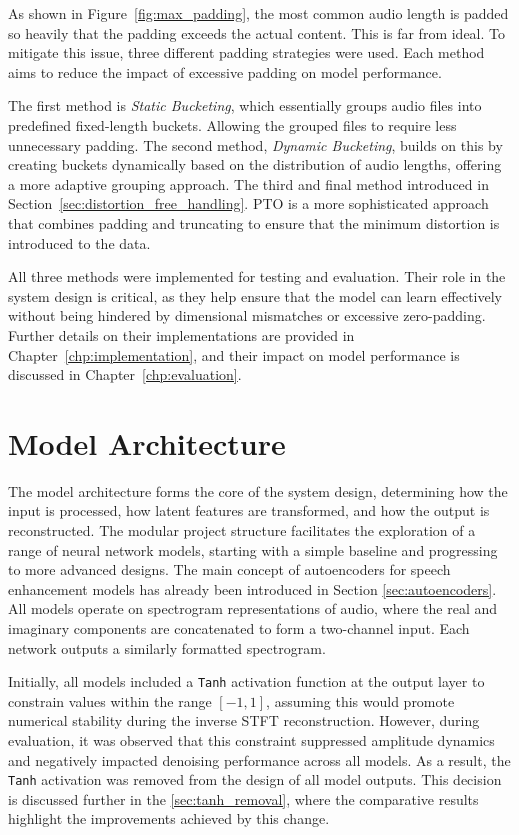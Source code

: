 As shown in Figure~\ref{fig:max_padding}, the most common audio length is padded so heavily that the padding exceeds the actual content. This is far from ideal. To mitigate this issue, three different padding strategies were used. Each method aims to reduce the impact of excessive padding on model performance.

The first method is \textit{Static Bucketing}, which essentially groups audio files into predefined fixed-length buckets. Allowing the grouped files to require less unnecessary padding. The second method, \textit{Dynamic Bucketing}, builds on this by creating buckets dynamically based on the distribution of audio lengths, offering a more adaptive grouping approach. The third and final method introduced in Section~\ref{sec:distortion_free_handling}. PTO is a more sophisticated approach that combines padding and truncating to ensure that the minimum distortion is introduced to the data.

All three methods were implemented for testing and evaluation. Their role in the system design is critical, as they help ensure that the model can learn effectively without being hindered by dimensional mismatches or excessive zero-padding. Further details on their implementations are provided in Chapter~\ref{chp:implementation}, and their impact on model performance is discussed in Chapter~\ref{chp:evaluation}.

\section{Model Architecture}
\label{sec:model_architecture}

The model architecture forms the core of the system design, determining how the input is processed, how latent features are transformed, and how the output is reconstructed. The modular project structure facilitates the exploration of a range of neural network models, starting with a simple baseline and progressing to more advanced designs. The main concept of autoencoders for speech enhancement models has already been introduced in Section \ref{sec:autoencoders}. All models operate on spectrogram representations of audio, where the real and imaginary components are concatenated to form a two-channel input. Each network outputs a similarly formatted spectrogram.

Initially, all models included a \texttt{Tanh} activation function at the output layer to constrain values within the range \([-1, 1]\), assuming this would promote numerical stability during the inverse STFT reconstruction. However, during evaluation, it was observed that this constraint suppressed amplitude dynamics and negatively impacted denoising performance across all models. As a result, the \texttt{Tanh} activation was removed from the design of all model outputs. This decision is discussed further in the \ref{sec:tanh_removal}, where the comparative results highlight the improvements achieved by this change.

